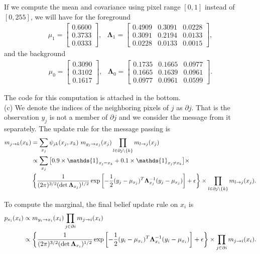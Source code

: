 \documentclass{article}
\newcommand{\s}[1]{\textsf{\textit{#1}}}
\begin{document}
If we compute the mean and covariance using pixel range $[0, 1]$ instead of $[0, 255]$, we will have for the foreground
\begin{align*}
	\mu_1 = 
	\begin{bmatrix}
    0.6600 \\
    0.3733 \\
    0.0333
\end{bmatrix}, \;\;\,
	\mathbf{\Lambda}_1 =
\begin{bmatrix}
 0.4909 & 0.3091 & 0.0228 \\
 0.3091 & 0.2194 & 0.0133 \\
 0.0228 & 0.0133 & 0.0015
\end{bmatrix},
\end{align*}
and the background
\begin{align*}
	\mu_0 = 
	\begin{bmatrix}
    0.3090 \\
    0.3102 \\
    0.1617
\end{bmatrix}, \;\;\,
	\mathbf{\Lambda}_0 =
\begin{bmatrix}
0.1735 & 0.1665 & 0.0977 \\
0.1665 & 0.1639 & 0.0961 \\
0.0977 & 0.0961 & 0.0599
\end{bmatrix}.
\end{align*}

The code for this computation is attached in the bottom.
\\

\noindent
(c)
We denote the indices of the neighboring pixels of $j$ as $\partial j$. That is the observation $y_j$ is not a member of $\partial j$ and we consider the message from it separately. The update rule for the message passing is
\begin{align*}
	m_{j\to k}(x_k) &= \sum_{x_j} \psi_{jk}(x_j, x_k)\,\,m_{y_j\to x_j}(x_j) \prod_{l\in\partial{j}\backslash\{k\}}m_{l\to j}(x_j)\\
	&\propto \sum_{x_j} \big[0.9\times\mathds{1}_{x_j = x_k} + 0.1\times\mathds{1}_{x_j \neq x_k} \big] \times\\
	& \left\{\frac{1}{(2\pi)^{3/2}(\det {\bf\Lambda}_{x_j})^{1/2}} \exp\left[-\frac{1}{2}(y_j-\mu_{x_j})^T\mathbf{\Lambda}^{-1}_{x_j}(y_j - \mu_{x_j})\right] + \epsilon\right\}
	\times \prod_{l\in\partial{j}\backslash\{k\}}m_{l\to j}(x_j).
\end{align*}
%

To compute the marginal, the final belief update rule on $x_i$ is
\begin{align*}
	p_{\s{x}_i}(x_i) &\propto  m_{y_i\to x_i}(x_i) \prod_{j\in\partial{i}}m_{j\to i}(x_i)\\
	&\propto \left\{\frac{1}{(2\pi)^{3/2}(\det {\bf\Lambda}_{x_i})^{1/2}} \exp\left[-\frac{1}{2}(y_i-\mu_{x_i})^T\mathbf{\Lambda}^{-1}_{x_i}(y_i - \mu_{x_i})\right] + \epsilon\right\}
	\times \prod_{j\in\partial{i}}m_{j\to i}(x_i).
\end{align*}
\\
\end{document}

